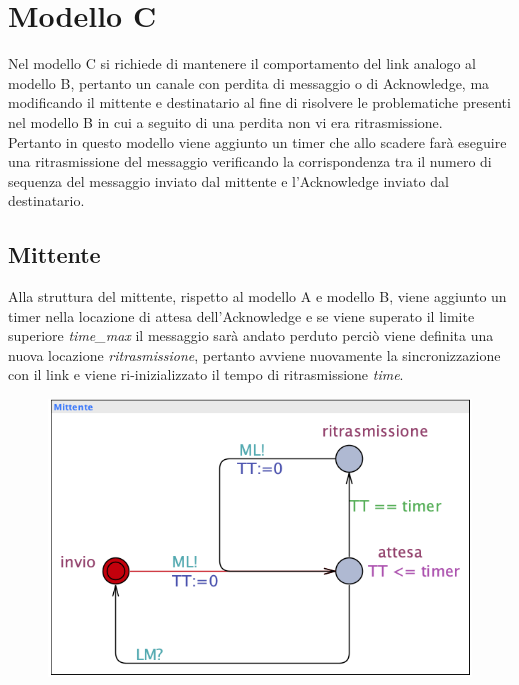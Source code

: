 \documentclass{article}
\begin{document}
\section{Modello C}
Nel modello C si richiede di mantenere il comportamento del link analogo al modello B, pertanto un canale con perdita di messaggio o di Acknowledge, ma modificando il mittente e destinatario al fine di risolvere le problematiche presenti nel modello B in cui a seguito di una perdita non vi era ritrasmissione. 
\\ Pertanto in questo modello viene aggiunto un timer che allo scadere farà eseguire una ritrasmissione del messaggio  verificando la corrispondenza tra il numero di sequenza del messaggio inviato dal mittente e l'Acknowledge inviato dal destinatario. 
\subsection{Mittente}
Alla struttura del mittente, rispetto al modello A e modello B, viene aggiunto un timer nella locazione di attesa dell'Acknowledge e se viene superato il limite superiore \textit{time\_max} il messaggio sarà andato perduto perciò viene definita una nuova locazione \textit{ritrasmissione}, pertanto avviene nuovamente la sincronizzazione con il link e viene ri-inizializzato il tempo di ritrasmissione \textit{time}.
\begin{figure}[h] 
\centering
\includegraphics[scale=0.4]{modelloCM.png}
\end{figure}
\end{document}

